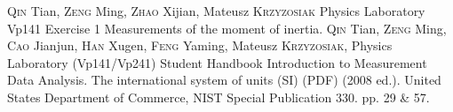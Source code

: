 \begin{thebibliography}{99}
     \textsc{Qin} Tian, \textsc{Zeng} Ming, \textsc{Zhao} Xijian, Mateusz \textsc{Krzyzosiak} Physics Laboratory Vp141 Exercise 1 Measurements of the moment of inertia.
     \textsc{Qin} Tian, \textsc{Zeng} Ming, \textsc{Cao} Jianjun, \textsc{Han} Xugen, \textsc{Feng} Yaming, Mateusz \textsc{Krzyzosiak}, Physics Laboratory (Vp141/Vp241) Student Handbook Introduction to Measurement Data Analysis.
     The international system of units (SI) (PDF) (2008 ed.). United States Department of Commerce, NIST Special Publication 330. pp. 29 \& 57.
\end{thebibliography}